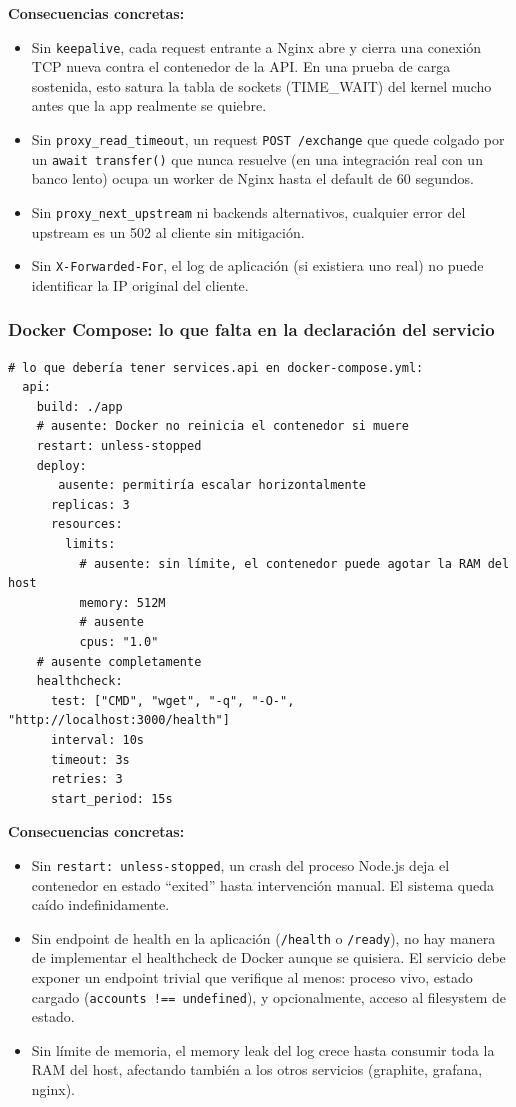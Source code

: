 \textbf{Consecuencias concretas:}
\begin{itemize}
    \item Sin \texttt{keepalive}, cada request entrante a Nginx abre y cierra una conexión TCP nueva contra el contenedor de la API. En una prueba de carga sostenida, esto satura la tabla de sockets (TIME\_WAIT) del kernel mucho antes que la app realmente se quiebre.
    \item Sin \texttt{proxy\_read\_timeout}, un request \texttt{POST /exchange} que quede colgado por un \texttt{await transfer()} que nunca resuelve (en una integración real con un banco lento) ocupa un worker de Nginx hasta el default de 60 segundos.
    \item Sin \texttt{proxy\_next\_upstream} ni backends alternativos, cualquier error del upstream es un 502 al cliente sin mitigación.
    \item Sin \texttt{X-Forwarded-For}, el log de aplicación (si existiera uno real) no puede identificar la IP original del cliente.
\end{itemize}

\subsubsection{Docker Compose: lo que falta en la declaración del servicio}

\begin{verbatim}
# lo que debería tener services.api en docker-compose.yml:
  api:
    build: ./app
    # ausente: Docker no reinicia el contenedor si muere
    restart: unless-stopped
    deploy:
       ausente: permitiría escalar horizontalmente
      replicas: 3
      resources:
        limits:
          # ausente: sin límite, el contenedor puede agotar la RAM del host
          memory: 512M
          # ausente
          cpus: "1.0"
    # ausente completamente
    healthcheck:
      test: ["CMD", "wget", "-q", "-O-", "http://localhost:3000/health"]
      interval: 10s
      timeout: 3s
      retries: 3
      start_period: 15s
\end{verbatim}

\textbf{Consecuencias concretas:}
\begin{itemize}
    \item Sin \texttt{restart: unless-stopped}, un crash del proceso Node.js deja el contenedor en estado ``exited'' hasta intervención manual. El sistema queda caído indefinidamente.
    \item Sin endpoint de health en la aplicación (\texttt{/health} o \texttt{/ready}), no hay manera de implementar el healthcheck de Docker aunque se quisiera. El servicio debe exponer un endpoint trivial que verifique al menos: proceso vivo, estado cargado (\texttt{accounts !== undefined}), y opcionalmente, acceso al filesystem de estado.
    \item Sin límite de memoria, el memory leak del log crece hasta consumir toda la RAM del host, afectando también a los otros servicios (graphite, grafana, nginx).
\end{itemize}


